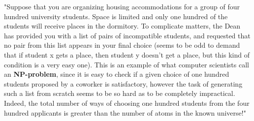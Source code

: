 \documentclass[12pt]{book}
\begin{document}
"Suppose that you are organizing housing accommodations for a group of four hundred university students. Space is limited and only one hundred of the students will receive places in the dormitory. To complicate matters, the Dean has
provided you with a list of pairs of incompatible students, and requested that no pair from this list appears in your final choice (seems to be odd to demand that if student x gets a place, then
student y doesn’t get a place, but this kind of condition is a very easy one). This is an example of what computer scientists call an \textbf{NP-problem}, since it is easy to check if a given choice of
one hundred students proposed by a coworker is satisfactory, however the task of generating such a list from scratch seems to be so hard as to be completely impractical. Indeed, the total number of ways 
of choosing one hundred students from the four hundred applicants is greater than the number of atoms in the known universe!"
\end{document}
